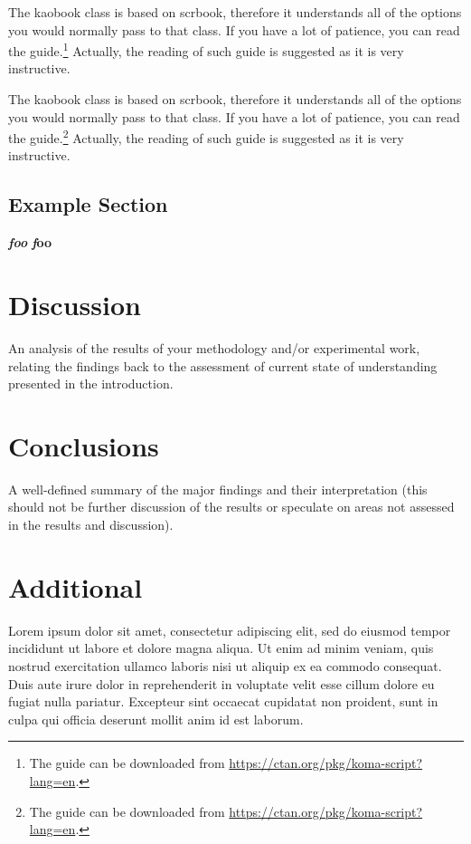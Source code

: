 \documentclass[12pt, letterpaper]{memoir}
\begin{document}
The kaobook class is based on scrbook, therefore it 
understands all of the options you would normally pass to that class. If 
you have a lot of patience, you can read the guide.\footnote{The guide can be downloaded from 
\url{https://ctan.org/pkg/koma-script?lang=en}.} Actually, the reading 
of such guide is suggested as it is very instructive.

The kaobook class is based on scrbook, therefore it 
understands all of the options you would normally pass to that class. If 
you have a lot of patience, you can read the guide.\footnote{The guide can be downloaded from 
\url{https://ctan.org/pkg/koma-script?lang=en}.} Actually, the reading 
of such guide is suggested as it is very instructive.


\section{Example Section}

 {\bfseries\slshape foo}  {\small \bfseries\textit foo}



\chapter{Discussion}
An analysis of the results of your methodology and/or experimental work, relating the findings back to the assessment of current state of understanding presented in the introduction.


\chapter{Conclusions}
A well-defined summary of the major findings and their interpretation (this should not be further discussion of the results or speculate on areas not assessed in the results and discussion).



\appendix

\chapter{Additional}
Lorem ipsum dolor sit amet, consectetur adipiscing elit, sed do eiusmod tempor incididunt ut labore et dolore magna aliqua. Ut enim ad minim veniam, quis nostrud exercitation ullamco laboris nisi ut aliquip ex ea commodo consequat. Duis aute irure dolor in reprehenderit in voluptate velit esse cillum dolore eu fugiat nulla pariatur. Excepteur sint occaecat cupidatat non proident, sunt in culpa qui officia deserunt mollit anim id est laborum. \citep{hk}






\end{document}

